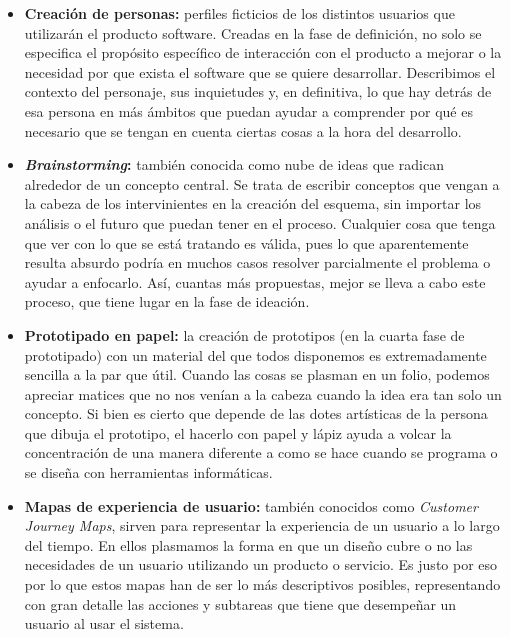 \begin{itemize}
	\item \textbf{Creación de personas:} perfiles ficticios de los distintos usuarios que utilizarán el producto software. Creadas en la fase de definición, no solo se especifica el propósito específico de interacción con el producto a mejorar o la necesidad por que exista el software que se quiere desarrollar. Describimos el contexto del personaje, sus inquietudes y, en definitiva, lo que hay detrás de esa persona en más ámbitos que puedan ayudar a comprender por qué es necesario que se tengan en cuenta ciertas cosas a la hora del desarrollo.
	
	\item \textbf{\textit{Brainstorming}:} también conocida como nube de ideas que radican alrededor de un concepto central. Se trata de escribir conceptos que vengan a la cabeza de los intervinientes en la creación del esquema, sin importar los análisis o el futuro que puedan tener en el proceso. Cualquier cosa que tenga que ver con lo que se está tratando es válida, pues lo que aparentemente resulta absurdo podría en muchos casos resolver parcialmente el problema o ayudar a enfocarlo. Así, cuantas más propuestas, mejor se lleva a cabo este proceso, que tiene lugar en la fase de ideación.
	
	\item \textbf{Prototipado en papel:} la creación de prototipos (en la cuarta fase de prototipado) con un material del que todos disponemos es extremadamente sencilla a la par que útil. Cuando las cosas se plasman en un folio, podemos apreciar matices que no nos venían a la cabeza cuando la idea era tan solo un concepto. Si bien es cierto que depende de las dotes artísticas de la persona que dibuja el prototipo, el hacerlo con papel y lápiz ayuda a volcar la concentración de una manera diferente a como se hace cuando se programa o se diseña con herramientas informáticas.
	
	\item \textbf{Mapas de experiencia de usuario:} también conocidos como \textit{Customer Journey Maps}, sirven para representar la experiencia de un usuario a lo largo del tiempo. En ellos plasmamos la forma en que un diseño cubre o no las necesidades de un usuario utilizando un producto o servicio. Es justo por eso por lo que estos mapas han de ser lo más descriptivos posibles, representando con gran detalle las acciones y subtareas que tiene que desempeñar un usuario al usar el sistema.
	
\end{itemize}

